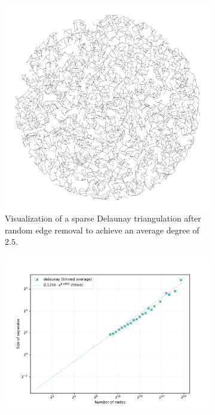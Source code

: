 \begin{figure}
    \centering
    \begin{subfigure}{0.35\linewidth}
        \centering
        \includegraphics[width=\linewidth]{graphics/delaunay_avg_deg.png} 
        \caption{Visualization of a sparse Delaunay triangulation after random edge removal to achieve an average degree of \(2.5\).}
        \label{fig:sparse_delaunay_viz} 
    \end{subfigure}
    \hfill
    \begin{subfigure}{0.55\linewidth}
        \centering
        \includegraphics[width=\linewidth]{graphics/sep_delaunay_avg_deg.png}

\end{subfigure}
\end{figure}
